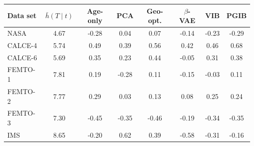 \begin{tabular}{l c c c c c c c}
\hline
Data set & $\bar h(T\mid t)$ & Age-only & PCA & Geo-opt. & $\beta$-VAE & VIB & PGIB \\
\hline
NASA & 4.67 & -0.28 & 0.04 & 0.07 & -0.14 & -0.23 & -0.29 \\
CALCE-4 & 5.74 & 0.49 & 0.39 & 0.56 & 0.42 & 0.46 & 0.68 \\
CALCE-6 & 5.69 & 0.35 & 0.23 & 0.44 & -0.05 & 0.31 & 0.38 \\
FEMTO-1 & 7.81 & 0.19 & -0.28 & 0.11 & -0.15 & -0.03 & 0.11 \\
FEMTO-2 & 7.77 & 0.29 & 0.03 & 0.13 & 0.08 & 0.25 & 0.24 \\
FEMTO-3 & 7.30 & -0.45 & -0.35 & -0.46 & -0.19 & -0.34 & -0.35 \\
IMS & 8.65 & -0.20 & 0.62 & 0.39 & -0.58 & -0.31 & -0.16 \\
\hline
\end{tabular}
